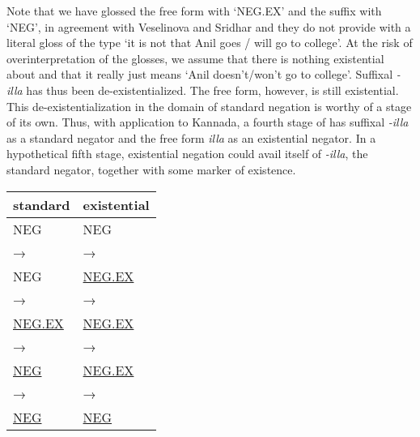 ﻿\documentclass[output=paper,draft,draftmode,colorlinks,citecolor=brown]{langscibook}
\begin{document}
%
Note that we have glossed the free form with `NEG.EX' and
the suffix with `NEG',
in agreement with Veselinova and
Sridhar and they do not  provide  with a literal gloss of
the type `it is not that Anil goes \slash{} will go to college'. At the risk of
overinterpretation of the glosses, we assume that there is nothing
existential about  and that it really just means `Anil
doesn't\slash{}won't go to college'. Suffixal \textit{-illa} has thus been
de-existentialized. The free form, however, is still existential. This
de-existentialization in the domain of standard negation is worthy of a
stage of its own. Thus, with application to Kannada, a fourth stage of
 has suffixal \textit{-illa} as a standard negator and the
free form \textit{illa} as an existential negator. In a hypothetical fifth
stage, existential negation could avail itself of \textit{-illa}, the
standard negator, together with some marker of existence.
%
\begin{exe}\begin{small}\ex\label{ex:int-fourth-stage}\begin{tabularx}{.5\textwidth}[t]{Q Q}
          standard & existential\\\midrule
        NEG                 &NEG            \\
→ & → \\
        NEG             &\uline{NEG.EX}  \\
→ & → \\
        \uline{NEG.EX}   &\uline{NEG.EX}  \\
→ & → \\
        \uline{NEG}   &\uline{NEG.EX}  \\
→ & → \\
        \uline{NEG}   &\uline{NEG}
\end{tabularx}\end{small}\end{exe}
\end{document}
